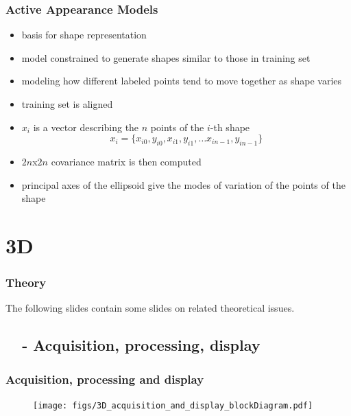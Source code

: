 \begin{frame}\frametitle{Active Appearance Models}\logoCSIPCPL\mypagenum
	\begin{itemize}
		\item basis for shape representation
		\item model constrained to generate shapes similar to those in training set		
		\item modeling how different labeled points tend to move together as shape varies
		\item training set is aligned
		\item $x_i$ is a vector describing the $n$ points of the $i$-th shape
			\begin{equation}
			x_i = \{x_{i0}, y_{i0}, x_{i1}, y_{i1}, \ldots x_{in-1}, y_{in-1}\}
			\end{equation}
		\item $2n$x$2n$ covariance matrix is then computed
		\item principal axes of the ellipsoid give the modes of variation of the points of the shape
	\end{itemize}
{}
\end{frame}



\section{3D}

\begin{frame}\frametitle{Theory}\logoEvolution\mypagenum
	The following slides contain some slides on related theoretical issues.
\end{frame}

\subsection{\ \ - Acquisition, processing, display}
\begin{frame}\frametitle{Acquisition, processing and display}
	\begin{figure}
		\texttt{[image: figs/3D\_acquisition\_and\_display\_blockDiagram.pdf]}
	\end{figure}
\end{frame}		
		

